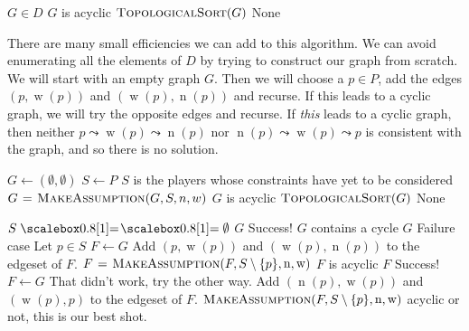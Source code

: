 \documentclass[12pt]{article}
\DeclareMathOperator{\w}{w}
\DeclareMathOperator{\n}{n}
\begin{document}
    \begin{codebox}
    \li \For $G\in D$
    \li     \Do
            \If $G$ is acyclic
    \li         \Do
                    \Return $\textnormal{\scshape TopologicalSort}(G)$
            \End
        \End
    \li \Return None
    \end{codebox}
        
    There are many small efficiencies we can add to this algorithm. We can avoid enumerating all the elements of $D$ by trying to construct our graph from scratch. We will start with an empty graph $G$. Then we will choose a $p \in P$, add the edges $(p,\w(p))$ and $(\w(p),\n(p))$ and recurse. If this leads to a cyclic graph, we will try the opposite edges and recurse. If \emph{this} leads to a cyclic graph, then neither $p \leadsto \w(p) \leadsto \n(p)$ nor $\n(p) \leadsto \w(p) \leadsto p$ is consistent with the graph, and so there is no solution.

    \begin{codebox}
    \li $G \gets (\emptyset, \emptyset)$
    \li $S \gets P$ \> \Comment $S$ is the players whose constraints have yet to be considered
    \li $G \mathrel{\hspace{1pt}=\hspace{1pt}} \textnormal{\scshape MakeAssumption}(G,S,n,w)$
    \li \If $G$ is acyclic
    \li     \Do
            \Return $\textnormal{\scshape TopologicalSort}(G)$
        \End
    \li \Return None
    \end{codebox}


    \begin{codebox}
    \Procname{$\proc{MakeAssumption}(G,S,\n,\w)$}
    \li \If $S \isequal \emptyset$
    \li     \Then
            \Return $G$ \Comment Success!
        \End
    \li \If $G$ contains a cycle
    \li     \Then
            \Return $G$ \Comment Failure case
        \End
    \li Let $p \in S$
    \li $F \gets G$
    \li Add $(p,\w(p))$ and $(\w(p),\n(p))$ to the edgeset of $F$.
    \li $F \gets \proc{MakeAssumption}(F,S\setminus \{p\}, \n, \w)$
    \li \If $F$ is acyclic
    \li     \Do
            \Return $F$ \Comment Success!
        \End
    \li $F \gets G$ \Comment That didn't work, try the other way.
    \li Add $(\n(p),\w(p))$ and $(\w(p),p)$ to the edgeset of $F$.
    \li \Return $\proc{MakeAssumption}(F,S\setminus \{p\}, \n, \w)$ \Comment acyclic or not, this is our best shot.
    \end{codebox}
\end{document}
